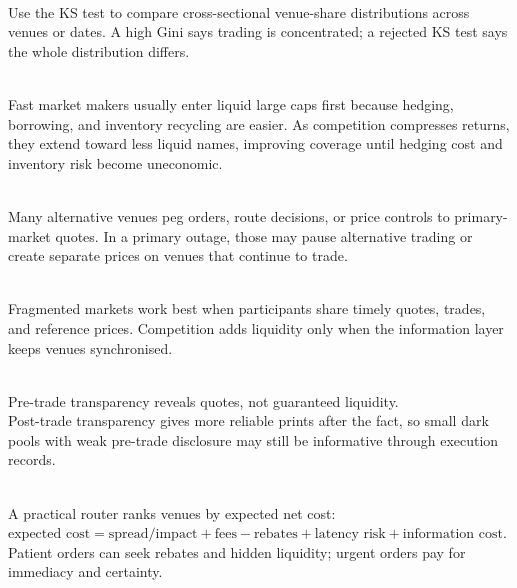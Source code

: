 \documentclass[a4paper,oneside,openany]{book}
\begin{document}
\begin{practitionernote} \\
Use the KS test to compare cross-sectional venue-share distributions across venues or dates. A high Gini says trading is concentrated; a rejected KS test says the whole distribution differs.
\end{practitionernote}

\begin{mechanism} \\
Fast market makers usually enter liquid large caps first because hedging, borrowing, and inventory recycling are easier. As competition compresses returns, they extend toward less liquid names, improving coverage until hedging cost and inventory risk become uneconomic.
\end{mechanism}

\begin{caveat} \\
Many alternative venues peg orders, route decisions, or price controls to primary-market quotes. In a primary outage, those may pause alternative trading or create separate prices on venues that continue to trade.
\end{caveat}

\begin{principle} \\
Fragmented markets work best when participants share timely quotes, trades, and reference prices. Competition adds liquidity only when the information layer keeps venues synchronised.
\end{principle}

\begin{caveat} \\
Pre-trade transparency reveals quotes, not guaranteed liquidity.\\
Post-trade transparency gives more reliable prints after the fact, so small dark pools with weak pre-trade disclosure may still be informative through execution records.
\end{caveat}

\begin{practitionernote} \\
A practical router ranks venues by expected net cost:\\
$\text{expected cost}
= \text{spread/impact}+\text{fees}-\text{rebates}+\text{latency risk}+\text{information cost}$.\\
Patient orders can seek rebates and hidden liquidity; urgent orders pay for immediacy and certainty.
\end{practitionernote}
\end{document}
